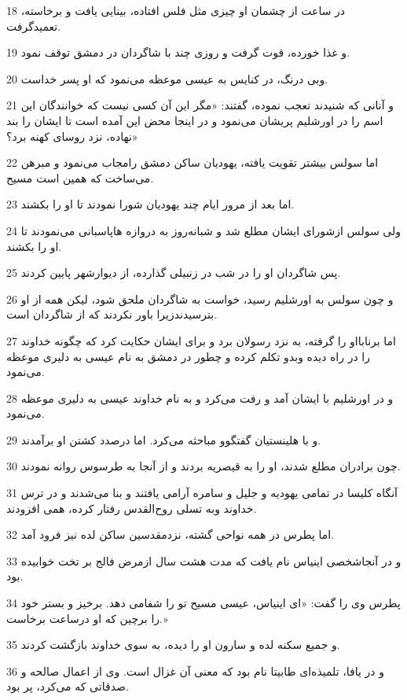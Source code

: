 \par 18 در ساعت از چشمان او چیزی مثل فلس افتاده، بینایی یافت و برخاسته، تعمیدگرفت.
\par 19 و غذا خورده، قوت گرفت و روزی چند با شاگردان در دمشق توقف نمود.
\par 20 وبی درنگ، در کنایس به عیسی موعظه می‌نمود که او پسر خداست.
\par 21 و آنانی که شنیدند تعجب نموده، گفتند: «مگر این آن کسی نیست که خوانندگان این اسم را در اورشلیم پریشان می‌نمود و در اینجا محض این آمده است تا ایشان را بند نهاده، نزد روسای کهنه برد؟»
\par 22 اما سولس بیشتر تقویت یافته، یهودیان ساکن دمشق رامجاب می‌نمود و مبرهن می‌ساخت که همین است مسیح.
\par 23 اما بعد از مرور ایام چند یهودیان شورا نمودند تا او را بکشند.
\par 24 ولی سولس ازشورای ایشان مطلع شد و شبانه‌روز به دروازه هاپاسبانی می‌نمودند تا او را بکشند.
\par 25 پس شاگردان او را در شب در زنبیلی گذارده، از دیوارشهر پایین کردند.
\par 26 و چون سولس به اورشلیم رسید، خواست به شاگردان ملحق شود، لیکن همه از او بترسیدندزیرا باور نکردند که از شاگردان است.
\par 27 اما برنابااو را گرفته، به نزد رسولان برد و برای ایشان حکایت کرد که چگونه خداوند را در راه دیده وبدو تکلم کرده و چطور در دمشق به نام عیسی به دلیری موعظه می‌نمود.
\par 28 و در اورشلیم با ایشان آمد و رفت می‌کرد و به نام خداوند عیسی به دلیری موعظه می‌نمود.
\par 29 و با هلینستیان گفتگوو مباحثه می‌کرد. اما درصدد کشتن او برآمدند.
\par 30 چون برادران مطلع شدند، او را به قیصریه بردند و از آنجا به طرسوس روانه نمودند.
\par 31 آنگاه کلیسا در تمامی یهودیه و جلیل و سامره آرامی یافتند و بنا می‌شدند و در ترس خداوند وبه تسلی روح‌القدس رفتار کرده، همی افزودند.
\par 32 اما پطرس در همه نواحی گشته، نزدمقدسین ساکن لده نیز فرود آمد.
\par 33 و در آنجاشخصی اینیاس نام یافت که مدت هشت سال ازمرض فالج بر تخت خوابیده بود.
\par 34 پطرس وی را گفت: «ای اینیاس، عیسی مسیح تو را شفامی دهد. برخیز و بستر خود را برچین که او درساعت برخاست.»
\par 35 و جمیع سکنه لده و سارون او را دیده، به سوی خداوند بازگشت کردند.
\par 36 و در یافا، تلمیذه‌ای طابیتا نام بود که معنی آن غزال است. وی از اعمال صالحه و صدقاتی که می‌کرد، پر بود.
